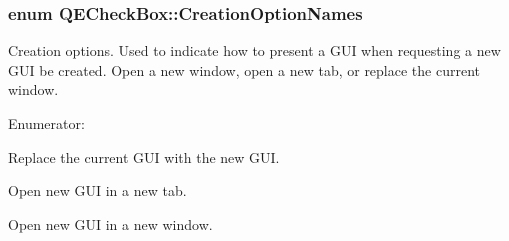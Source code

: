 \hypertarget{classQECheckBox_ae961d2f2273ccca3b41faf87f0b87cf0}{
\subsubsection[{CreationOptionNames}]{\setlength{\rightskip}{0pt plus 5cm}enum {\bf QECheckBox::CreationOptionNames}}}
\label{classQECheckBox_ae961d2f2273ccca3b41faf87f0b87cf0}


Creation options. Used to indicate how to present a GUI when requesting a new GUI be created. Open a new window, open a new tab, or replace the current window. 

\begin{Desc}
\item[Enumerator: ]\par
\begin{description}
\item[{\em 
\hypertarget{classQECheckBox_ae961d2f2273ccca3b41faf87f0b87cf0a3f4b841d5b22e26029f56f26bcf21d05}{
Open}
\label{classQECheckBox_ae961d2f2273ccca3b41faf87f0b87cf0a3f4b841d5b22e26029f56f26bcf21d05}
}]Replace the current GUI with the new GUI. \item[{\em 
\hypertarget{classQECheckBox_ae961d2f2273ccca3b41faf87f0b87cf0acaa17e90bb1ed20c250fc512dbeeb54f}{
NewTab}
\label{classQECheckBox_ae961d2f2273ccca3b41faf87f0b87cf0acaa17e90bb1ed20c250fc512dbeeb54f}
}]Open new GUI in a new tab. \item[{\em 
\hypertarget{classQECheckBox_ae961d2f2273ccca3b41faf87f0b87cf0abcbcc60d5124e0b269e650d42c9b5675}{
NewWindow}
\label{classQECheckBox_ae961d2f2273ccca3b41faf87f0b87cf0abcbcc60d5124e0b269e650d42c9b5675}
}]Open new GUI in a new window. \end{description}
\end{Desc}

